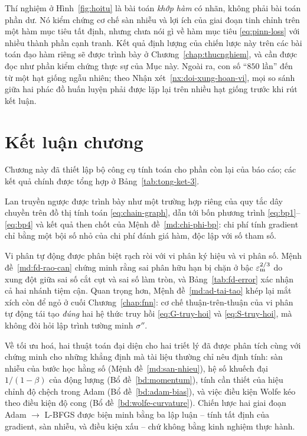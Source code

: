 \begin{nhanxet}
Thí nghiệm ở Hình~\ref{fig:hoitu} là bài toán \emph{khớp hàm} có nhãn, không phải
bài toán phần dư. Nó kiểm chứng cơ chế sàn nhiễu và lợi ích của giai đoạn tinh
chỉnh trên một hàm mục tiêu tất định, nhưng chưa nói gì về hàm mục tiêu
\eqref{eq:pinn-loss} với nhiều thành phần cạnh tranh. Kết quả định lượng của
chiến lược này trên các bài toán đạo hàm riêng sẽ được trình bày ở
Chương~\ref{chap:thucnghiem}, và cần được đọc như phần kiểm chứng thực sự của
Mục này. Ngoài ra, con số ``$850$ lần'' đến từ một hạt giống ngẫu nhiên; theo
Nhận xét~\ref{nx:doi-xung-hoan-vi}, mọi so sánh giữa hai phác đồ huấn luyện phải
được lặp lại trên nhiều hạt giống trước khi rút kết luận.
\end{nhanxet}
 
\section*{Kết luận chương}
 
Chương này đã thiết lập bộ công cụ tính toán cho phần còn lại của báo cáo; các
kết quả chính được tổng hợp ở Bảng~\ref{tab:tong-ket-3}.
 
Lan truyền ngược được trình bày như một trường hợp riêng của quy tắc dây chuyền
trên đồ thị tính toán \eqref{eq:chain-graph}, dẫn tới bốn phương trình
\eqref{eq:bp1}--\eqref{eq:bp4} và kết quả then chốt của
Mệnh đề~\ref{md:chi-phi-bp}: chi phí tính gradient chỉ bằng một bội số nhỏ của
chi phí đánh giá hàm, độc lập với số tham số.
 
Vi phân tự động được phân biệt rạch ròi với vi phân ký hiệu và vi phân số.
Mệnh đề~\ref{md:fd-rao-can} chứng minh rằng sai phân hữu hạn bị chặn ở bậc
$\varepsilon_{\mathrm{m}}^{2/3}$ do xung đột giữa sai số cắt cụt và sai số làm tròn, và
Bảng~\ref{tab:fd-error} xác nhận cả hai nhánh tiệm cận. Quan trọng hơn,
Mệnh đề~\ref{md:ad-tai-tao} khép lại mắt xích còn để ngỏ ở cuối
Chương~\ref{chap:fnn}: cơ chế thuận-trên-thuận của vi phân tự động tái tạo
\emph{đúng} hai hệ thức truy hồi \eqref{eq:G-truy-hoi} và \eqref{eq:S-truy-hoi},
mà không đòi hỏi lập trình tường minh $\sigma''$.
 
Về tối ưu hoá, hai thuật toán đại diện cho hai triết lý đã được phân tích cùng
với chứng minh cho những khẳng định mà tài liệu thường chỉ nêu định tính: sàn
nhiễu của bước học hằng số (Mệnh đề~\ref{md:san-nhieu}), hệ số khuếch đại
$1/(1-\beta)$ của động lượng (Bổ đề~\ref{bd:momentum}), tính cần thiết của hiệu
chỉnh độ chệch trong Adam (Bổ đề~\ref{bd:adam-bias}), và việc điều kiện Wolfe kéo
theo điều kiện độ cong (Bổ đề~\ref{bd:wolfe-curvature}). Chiến lược hai giai đoạn
Adam $\to$ L-BFGS được biện minh bằng ba lập luận -- tính tất định của gradient,
sàn nhiễu, và điều kiện xấu -- chứ không bằng kinh nghiệm thực hành.
 
